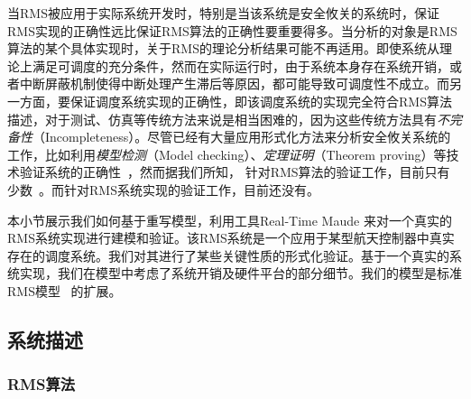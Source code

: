 当RMS被应用于实际系统开发时，特别是当该系统是安全攸关的系统时，保证RMS实现的正确性远比保证RMS算法的正确性要重要得多。当分析的对象是RMS算法的某个具体实现时，关于RMS的理论分析结果可能不再适用。即使系统从理论上满足可调度的充分条件，然而在实际运行时，由于系统本身存在系统开销，或者中断屏蔽机制使得中断处理产生滞后等原因，都可能导致可调度性不成立。而另一方面，要保证调度系统实现的正确性，即该调度系统的实现完全符合RMS算法描述，对于测试、仿真等传统方法来说是相当困难的，因为这些传统方法具有\emph{不完备性}（Incompleteness）。尽管已经有大量应用形式化方法来分析安全攸关系统的工作，比如利用\emph{模型检测}（Model checking）、\emph{定理证明}（Theorem proving）等技术验证系统的正确性~\cite{DBLP:journals/tie/JiangZLDSGS15,DBLP:journals/iandc/MeseguerR13,DBLP:journals/cacm/Leroy09,DBLP:conf/sosp/KleinEHACDEEKNSTW09}，然而据我们所知，
针对RMS算法的验证工作，目前只有少数~\cite{TianD2011,DBLP:conf/iceccs/CuiDT14}。而针对RMS系统实现的验证工作，目前还没有。

本小节展示我们如何基于重写模型，利用工具Real-Time Maude 来对一个真实的RMS系统实现进行建模和验证。该RMS系统是一个应用于某型航天控制器中真实存在的调度系统。我们对其进行了某些关键性质的形式化验证。基于一个真实的系统实现，我们在模型中考虑了系统开销及硬件平台的部分细节。我们的模型是标准RMS模型~\cite{DBLP:journals/jacm/LiuL73} 的扩展。


\subsection{系统描述}
\label{s:background}

\subsubsection{RMS算法}
\label{ss:rms}

